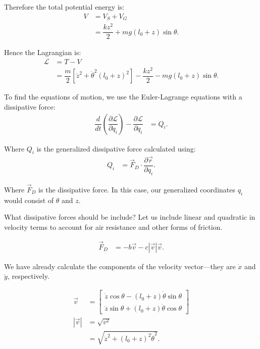\documentclass[12pt,a4paper,portrait]{article}
\begin{document}
Therefore the total potential energy is:
\begin{align*}
	V &= V_S + V_G \\
	&= \dfrac{kz^2}{2} + mg(l_0+z)\sin{\theta}.
\end{align*}

Hence the Lagrangian is:
\begin{align*}
	\mathcal{L} &= T - V \\
	&= \dfrac{m}{2} \left[\dot{z}^2 + \dot{\theta}^2(l_0+z)^2\right] - \dfrac{kz^2}{2} - mg(l_0+z)\sin{\theta}.
\end{align*}

To find the equations of motion, we use the Euler-Lagrange equations with a dissipative force:
\begin{align}
	\dfrac{d}{dt}\left(\dfrac{\partial \mathcal{L}}{\partial \dot{q}_i}\right) - \dfrac{\partial \mathcal{L}}{\partial q_i} &= Q_i. \label{ELD}
\end{align}

Where $Q_i$ is the generalized dissipative force calculated using:
\begin{align*}
	Q_i &= \vec{F}_{D} \cdot \dfrac{\partial \vec{r}}{\partial q_i}.
\end{align*}

Where $\vec{F}_D$ is the dissipative force. In this case, our generalized coordinates $q_i$ would consist of $\theta$ and $z$. 

What dissipative forces should be include? Let us include linear and quadratic in velocity terms to account for air resistance and other forms of friction. 

\begin{align*}
	\vec{F}_D &= -b\vec{v} - c|\vec{v}|\vec{v}.
\end{align*}

We have already calculate the components of the velocity vector---they are $\dot{x}$ and $\dot{y}$, respectively. 

\begin{align*}
	\vec{v} &= \begin{bmatrix}
		\dot{z}\cos{\theta} - (l_0+z)\dot{\theta}\sin{\theta} \\
		\dot{z}\sin{\theta} + (l_0+z)\dot{\theta}\cos{\theta}
	\end{bmatrix}\\
	|\vec{v}| &= \sqrt{v^2}\\
	&= \sqrt{\dot{z}^2+(l_0+z)^2\dot{\theta}^2}.
\end{align*}
\end{document}
